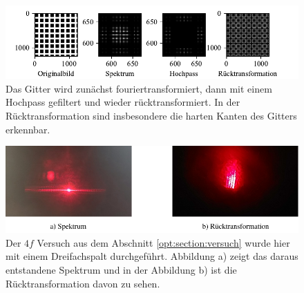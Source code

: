 \begin{figure}
    \centering
    \includegraphics[width=\textwidth]{papers/opt/images/gitter_hochpass.pdf}
    \caption{Das Gitter wird zunächst fouriertransformiert, dann mit einem Hochpass gefiltert und wieder rücktransformiert.
    In der Rücktransformation sind insbesondere die harten Kanten des Gitters erkennbar.}
    \label{opt:fig:grid_simulation}
\end{figure}

\begin{figure}
    \centering
    \includegraphics[width=\textwidth]{papers/opt/images/experiment.pdf}
    \caption{Der $4f$ Versuch aus dem Abschnitt \ref{opt:section:versuch} wurde hier mit einem Dreifachspalt durchgeführt.
    Abbildung a) zeigt das daraus entstandene Spektrum und in der Abbildung b) ist die Rücktransformation davon zu sehen.}
    \label{opt:fig:experiment}
\end{figure}
